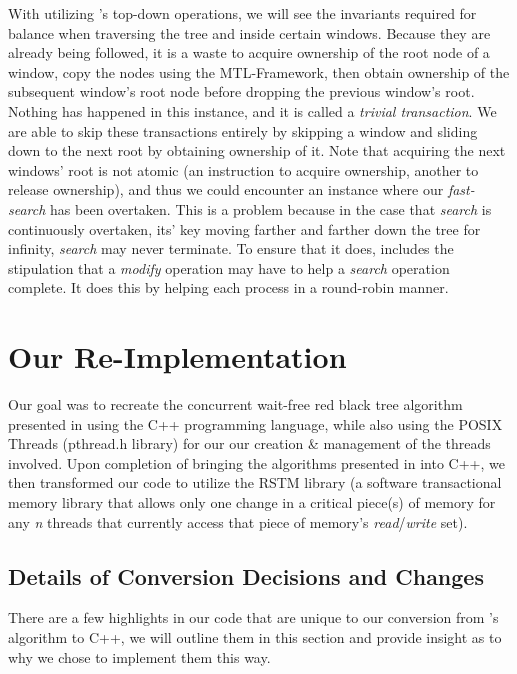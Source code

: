 \documentclass[letterpaper, 10 pt, conference]{ieeeconf}
\begin{document}
	With utilizing \cite{c7}'s top-down operations, we will see the invariants required for balance when traversing the tree and inside certain windows. Because they are already being followed, it is a waste to acquire ownership of the root node of a window, copy the nodes using the MTL-Framework, then obtain ownership of the subsequent window's root node before dropping the previous window's root. Nothing has happened in this instance, and it is called a \textit{trivial transaction}. We are able to skip these transactions entirely by skipping a window and sliding down to the next root by obtaining ownership of it. Note that acquiring the next windows' root is not atomic (an instruction to acquire ownership, another to release ownership), and thus we could encounter an instance where our \textit{fast-search} has been overtaken. This is a problem because in the case that \textit{search} is continuously overtaken, its' key moving farther and farther down the tree for infinity, \textit{search} may never terminate. To ensure that it does, \cite{c1} includes the stipulation that a \textit{modify} operation may have to help a \textit{search} operation complete. It does this by helping each process in a round-robin manner.
	
	
	
\section{Our Re-Implementation}
Our goal was to recreate the concurrent wait-free red black tree algorithm presented in \cite{c1} using the C++ programming language, while also using the POSIX Threads (pthread.h library) for our our creation \& management of the threads involved. Upon completion of bringing the algorithms presented in \cite{c1} into C++, we then transformed our code to utilize the RSTM library (a software transactional memory library that allows only one change in a critical piece(s) of memory for any \textit{n} threads that currently access that piece of memory's \textit{read}/\textit{write} set). 
	\subsection{Details of Conversion Decisions and Changes}

	There are a few highlights in our code that are unique to our conversion from \cite{c1}'s algorithm to C++, we will outline them in this section and provide insight as to why we chose to implement them this way.
\end{document}
